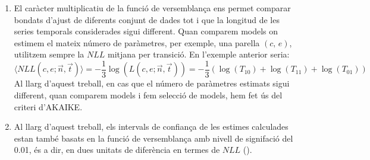 \documentclass{article}
\begin{document}
\begin{enumerate}
    \item El car\`acter multiplicatiu de la funci\'o de versemblan\c{c}a ens permet comparar bondats d'ajust de diferents conjunt de dades tot i que la longitud de les series temporals considerades sigui different. Quan comparem models on estimem el mateix n\'umero de par\`ametres, per exemple, una parella $(c,\, e)$, utilitzem sempre la $NLL$ mitjana per transici\'o. En l'exemple anterior seria:  
    \begin{equation}
        \langle NLL(c, e; \vec{n}, \vec{t}) \rangle = -\frac{1}{3}\log(L(c, e; \vec{n}, \vec{t}))= -\frac{1}{3} \left(\log(T_{10}) + \log(T_{11}) + \log(T_{01})\right) 
    \end{equation}
    Al llarg d'aquest treball, en cas que el n\'umero de par\`ametres estimats sigui different, quan comparem models i fem selecci\'o de models, hem fet \'us del criteri d'AKAIKE.
    
    \item Al llarg d'aquest treball, els intervals de confian\c{c}a de les estimes calculades estan tamb\'e basats en la funci\'o de versemblan\c{c}a amb nivell de signifaci\'o del 0.01, \'es a dir, en dues unitats de difer\`encia en termes de $NLL$ (\cite{Ontiveros2019}). 
\end{enumerate}








\end{document}
